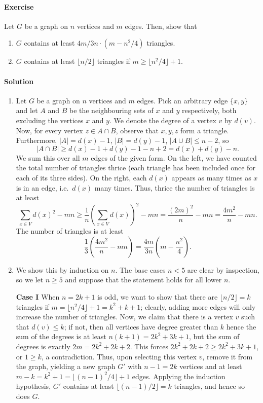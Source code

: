 \documentclass[10pt]{article}
\newcounter{prob}
\newcommand{\problem}{\stepcounter{prob}\paragraph{Exercise \arabic{prob}}}
\newcommand{\solution}{\paragraph{Solution}}
\begin{document}
    \problem Let $G$ be a graph on $n$ vertices and $m$ edges. Then, show that
    \begin{enumerate}
        \itemsep0em
        \item $G$ contains at least $4m/3n \cdot (m - n^2 / 4)$ triangles.
        \item $G$ contains at least $\lfloor n / 2\rfloor$ triangles if $m \geq
        \lfloor n^2 / 4\rfloor + 1$.
    \end{enumerate}

    \solution \mbox{}
    \begin{enumerate}
        \item Let $G$ be a graph on $n$ vertices and $m$ edges. Pick an arbitrary
        edge $\{x, y\}$ and let $A$ and $B$ be the neighbouring sets of $x$ and $y$
        respectively, both excluding the vertices $x$ and $y$. We denote the degree of
        a vertex $v$ by $d(v)$. Now, for every vertex $z \in A \cap B$, observe that
        $x,y,z$ form a triangle. Furthermore, $|A| = d(x) - 1$, $|B| = d(y) - 1$, $|A
        \cup B| \leq n - 2$, so \[
            |A \cap B| \geq d(x) - 1 + d(y) - 1 - n + 2 = d(x) + d(y) - n.
        \] We sum this over all $m$ edges of the given form. On the left, we have
        counted the total number of triangles thrice (each triangle has been included
        once for each of its three sides). On the right, each $d(x)$ appears as many
        times as $x$ is in an edge, i.e.\ $d(x)$ many times. Thus, thrice the number
        of triangles is at least \[
            \sum_{x \in V} d(x)^2 - mn \geq \frac{1}{n}\left(\sum_{x \in
            V}d(x)\right)^2 - mn = \frac{(2m)^2}{n} - mn = \frac{4m^2}{n} - mn.
        \] The number of triangles is at least \[
            \frac{1}{3}\left(\frac{4m^2}{n} - mn\right) = \frac{4m}{3n}\left(m -
            \frac{n^2}{4}\right).
        \] 

        \item We show this by induction on $n$. The base cases $n < 5$ are clear
        by inspection, so we let $n \geq 5$ and suppose that the statement holds for
        all lower $n$.

        \textbf{Case I} When $n = 2k + 1$ is odd, we want to show that there are
        $\lfloor n / 2\rfloor = k$ triangles if $m = \lfloor n^2 / 4\rfloor + 1 =
        k^2 + k + 1$; clearly, adding more edges will only increase the number of
        triangles. Now, we claim that there is a vertex $v$ such that $d(v) \leq k$;
        if not, then all vertices have degree greater than $k$ hence the sum of the
        degrees is at least $n(k + 1) = 2k^2 + 3k + 1$, but the sum of degrees is
        exactly $2m = 2k^2 + 2k + 2$. This forces $2k^2 + 2k + 2 \geq 2k^2 + 3k + 1$,
        or $1 \geq k$, a contradiction. Thus, upon selecting this vertex $v$, remove
        it from the graph, yielding a new graph $G'$ with $n - 1 = 2k$ vertices and
        at least $m - k = k^2 + 1 = \lfloor (n - 1)^2 / 4\rfloor + 1$ edges. Applying
        the induction hypothesis, $G'$ contains at least $\lfloor (n - 1) / 2\rfloor
        = k$ triangles, and hence so does $G$.
        

\end{enumerate}
\end{document}
